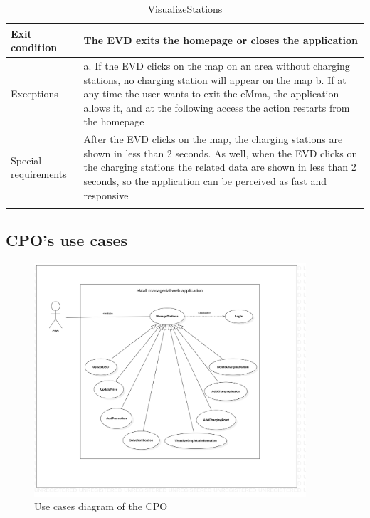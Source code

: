 \begin{center}
\begin{longtable}{p{4cm} p{11cm}}
     \\
     \hline
     Exit condition & The EVD exits the homepage or closes the application \\
     \hline
     Exceptions &   a. If the EVD clicks on the map on an area without charging stations, no charging station will appear on the map \newline
                    b. If at any time the user wants to exit the eMma, the application allows it, and at the following access the action restarts from the homepage \\
     \hline
     Special requirements & After the EVD clicks on the map, the charging stations are shown in less than 2 seconds. As well, when the EVD clicks on the charging stations the related data are shown in less than 2 seconds, so the application can be perceived as fast and responsive \\
     \hline
    \caption{VisualizeStations}
    \label{tab:VisualizeStations}
    \end{longtable}
\end{center}

\subsection{CPO's use cases}
\begin{figure}[H]
    \centering
    \includegraphics[width= 0.9\textwidth, trim={2cm 5cm 5cm 3cm}, clip]{Images/cp3/UseCaseDiagramCPO.png}
    \caption{Use cases diagram of the CPO}
\end{figure}
